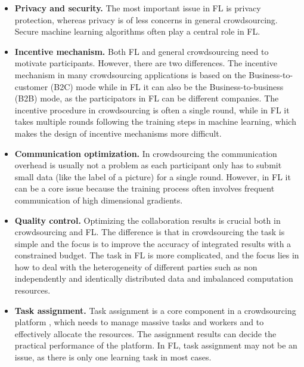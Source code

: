 \documentclass[11pt]{article}
\begin{document}
\begin{itemize}
	\item \textbf{Privacy and security.} 
	The most important issue in FL is privacy protection, whereas privacy is of less concerns in general crowdsourcing. 
	Secure machine learning algorithms often play a central role in FL. 
	\item \textbf{Incentive mechanism.} 
	Both FL and general crowdsourcing need to motivate participants. 
	However, there are two differences. 
	The incentive mechanism in many crowdsourcing applications is based on the Business-to-customer (B2C) mode while in FL it can also be the Business-to-business (B2B) mode, as the participators in FL can be different companies. 
	The incentive procedure in crowdsourcing is often a single round, while in FL it takes multiple rounds following the training steps in machine learning, which makes the design of incentive mechanisms more difficult.
	\item \textbf{Communication optimization.} 
	In crowdsourcing the communication overhead is usually not a problem as each participant only has to submit small data (like the label of a picture) for a single round. 
	However, in FL it can be a core issue because the training process often involves frequent communication of high dimensional gradients. 
	\item \textbf{Quality control.} 
	Optimizing the collaboration results is crucial both in crowdsourcing and FL. 
	The difference is that in crowdsourcing the task is simple and the focus is to improve the accuracy of integrated results with a constrained budget. 
	The task in FL is more complicated, and the focus lies in how to deal with the heterogeneity of different parties such as non independently and identically distributed data and imbalanced computation resources.
	\item \textbf{Task assignment.} 
	Task assignment is a core component in a crowdsourcing platform \cite{DBLP:conf/icde/TongSDWC16, 8897719}, which needs to manage massive tasks and workers and to effectively allocate the resources. 
	The assignment results can decide the practical performance of the platform. 
	In FL, task assignment may not be an issue, as there is only one learning task in most cases. 
\end{itemize}
\end{document}
